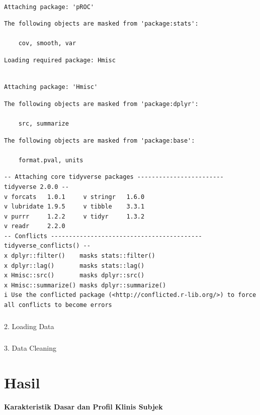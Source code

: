 \documentclass[
  indonesian,
]{agujournal2019}
\makeatletter
\let\oldsubparagraph\subparagraph
\renewcommand{\subparagraph}{
    \@ifstar
      \xxxSubParagraphStar
      \xxxSubParagraphNoStar
  }
\newcommand{\xxxSubParagraphStar}[1]{\oldsubparagraph*{#1}\mbox{}}
\newcommand{\xxxSubParagraphNoStar}[1]{\oldsubparagraph{#1}\mbox{}}
\makeatother
\begin{document}
\begin{verbatim}

Attaching package: 'pROC'
\end{verbatim}

\begin{verbatim}
The following objects are masked from 'package:stats':

    cov, smooth, var
\end{verbatim}

\begin{verbatim}
Loading required package: Hmisc
\end{verbatim}

\begin{verbatim}

Attaching package: 'Hmisc'
\end{verbatim}

\begin{verbatim}
The following objects are masked from 'package:dplyr':

    src, summarize
\end{verbatim}

\begin{verbatim}
The following objects are masked from 'package:base':

    format.pval, units
\end{verbatim}

\begin{verbatim}
-- Attaching core tidyverse packages ------------------------ tidyverse 2.0.0 --
v forcats   1.0.1     v stringr   1.6.0
v lubridate 1.9.5     v tibble    3.3.1
v purrr     1.2.2     v tidyr     1.3.2
v readr     2.2.0     
-- Conflicts ------------------------------------------ tidyverse_conflicts() --
x dplyr::filter()    masks stats::filter()
x dplyr::lag()       masks stats::lag()
x Hmisc::src()       masks dplyr::src()
x Hmisc::summarize() masks dplyr::summarize()
i Use the conflicted package (<http://conflicted.r-lib.org/>) to force all conflicts to become errors
\end{verbatim}

\subparagraph{2. Loading Data}\label{loading-data}

\subparagraph{3. Data Cleaning}\label{data-cleaning}

\section{Hasil}\label{hasil}

\textbf{Karakteristik Dasar dan Profil Klinis Subjek}
\end{document}
